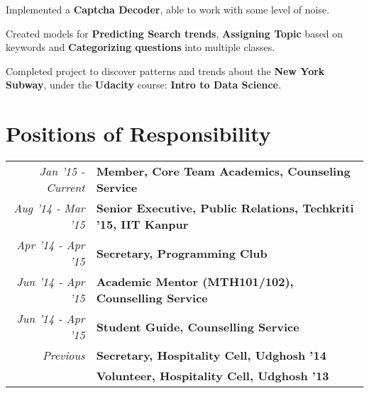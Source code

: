 \documentclass[a4paper]{norm-resume}
\begin{document}
	\begin{tightitemize}
	\small
	{
	\item Implemented a \textbf{Captcha Decoder}, able to work with some level of noise.
	\item Created models for \textbf{Predicting Search trends}, \textbf{Assigning Topic} based on keywords and \textbf{Categorizing questions} into multiple classes.
	\item Completed project to discover patterns and trends about the \textbf{New York Subway}, under the \textbf{Udacity} course: \textbf{Intro to Data Science}.
	}
	\end{tightitemize}		

\vspace{1mm}	%


\section{Positions of Responsibility}

\vspace{2mm} %
		
	\begin{tabular}{r|p{16cm}}	
	
	\null \hspace{10mm} \normalsize\emph{Jan '15 - Current} & \normalsize\textbf{Member, Core Team Academics, Counseling Service}\\
	\normalsize\emph{Aug '14 - Mar '15} & \normalsize\textbf{Senior Executive, Public Relations, Techkriti '15, IIT Kanpur}\\
	\normalsize\emph{Apr '14 - Apr '15} & \normalsize\textbf{Secretary, Programming Club}\\
	\normalsize\emph{Jun '14 - Apr '15} & \normalsize\textbf{Academic Mentor (MTH101/102), Counselling Service}\\ 
	\normalsize\emph{Jun '14 - Apr '15} & \normalsize\textbf{Student Guide, Counselling Service}\\
	\normalsize\emph{Previous} & \normalsize\textbf{Secretary, Hospitality Cell, Udghosh '14}\\
	& \normalsize\textbf{Volunteer, Hospitality Cell, Udghosh '13}\\

	\end{tabular}

\vspace{1mm}	%
\end{document}
